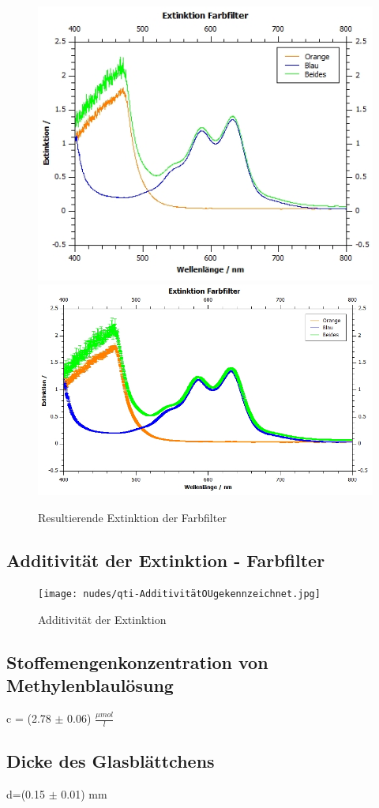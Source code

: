 \documentclass[12pt,a4paper,twoside]{article}
\begin{document}
\begin{figure}[H]
    \centering
    \includegraphics[width=0.4\linewidth]{nudes/qti-Extinktion-FarbfilterOU.jpg}
    \includegraphics[width=0.4\linewidth]{nudes/qti-Extinktion-Farbfilter.jpg}
    \caption{Resultierende Extinktion der Farbfilter}
    \label{fig:ExtinktionFarbfilterAW}
\end{figure}


\subsection{Additivität der Extinktion - Farbfilter}

\begin{figure}[H]
    \centering
    \texttt{[image: nudes/qti-AdditivitätOUgekennzeichnet.jpg]}
    \caption{Additivität der Extinktion}
    \label{fig:AdditivitätExtinktionAW}
\end{figure}


\subsection{Stoffemengenkonzentration von Methylenblaulösung}

c = (2.78 $\pm$ 0.06) $\frac{\mu mol}{l}$


\subsection{Dicke des Glasblättchens}

d=(0.15 $\pm$ 0.01) mm


\printbibliography[heading=bibintoc]
\end{document}
